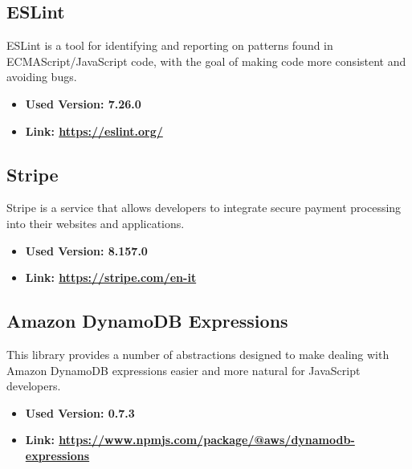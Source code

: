 \subsection{ESLint}
ESLint is a tool for identifying and reporting on patterns found in ECMAScript/JavaScript code, with the goal of making code more consistent and avoiding bugs.
\begin{itemize}
  \item \textbf{Used Version: 7.26.0}
  \item \textbf{Link: \url{https://eslint.org/}}
\end{itemize}
\subsection{Stripe}
Stripe is a service that allows developers to integrate secure payment processing into their websites and applications.
\begin{itemize}
  \item \textbf{Used Version: 8.157.0}
  \item \textbf{Link: \url{https://stripe.com/en-it}}
\end{itemize}
\subsection{Amazon DynamoDB Expressions}
This library provides a number of abstractions designed to make dealing with Amazon DynamoDB expressions easier and more natural for JavaScript developers.
\begin{itemize}
  \item \textbf{Used Version: 0.7.3}
  \item \textbf{Link: \url{https://www.npmjs.com/package/@aws/dynamodb-expressions}}
\end{itemize}
